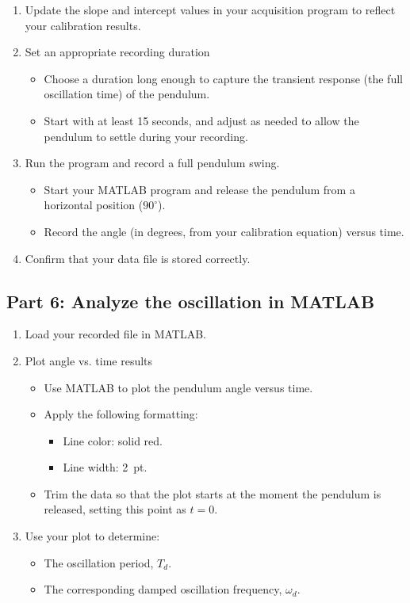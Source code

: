\documentclass{article}
\begin{document}
\begin{enumerate}
    \item Update the slope and intercept values in your acquisition program to reflect your calibration results.
    \item Set an appropriate recording duration
    \begin{itemize}
        \item Choose a duration long enough to capture the transient response (the full oscillation time) of the pendulum.
        \item Start with at least 15 seconds, and adjust as needed to allow the pendulum to settle during your recording.
    \end{itemize}
    \item Run the program and record a full pendulum swing.
    \begin{itemize}
        \item Start your MATLAB program and release the pendulum from a horizontal position ($90^\circ$).
        \item Record the angle (in degrees, from your calibration equation) versus time.  
    \end{itemize}
    \item Confirm that your data file is stored correctly.
 \end{enumerate}

\subsection{Part 6: Analyze the oscillation in MATLAB}
    \begin{enumerate}
        \item Load your recorded  file in MATLAB.
        \item Plot angle vs. time results
        \begin{itemize}
            \item Use MATLAB to plot the pendulum angle versus time.  
            \item Apply the following formatting:
            \begin{itemize}
                \item Line color: solid red.  
                \item Line width: 2~pt.
            \end{itemize}
            \item Trim the data so that the plot starts at the moment the pendulum is released, setting this point as $t = 0$.
        \end{itemize}   
    \item Use your plot to determine:
        \begin{itemize}
            \item The oscillation period, $T_d$.
            \item The corresponding damped oscillation frequency, $\omega_d$.
        \end{itemize}
    \end{enumerate}
\end{document}
